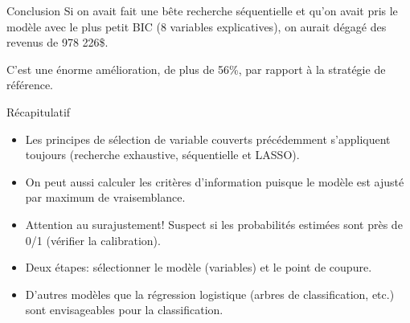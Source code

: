 \documentclass[
  ignorenonframetext,
]{beamer}
\providecommand{\tightlist}{%
  \setlength{\itemsep}{0pt}\setlength{\parskip}{0pt}}\usepackage{longtable,booktabs,array}
\begin{document}
\begin{frame}{Conclusion}
\protect\hypertarget{conclusion}{}
Si on avait fait une bête recherche séquentielle et qu'on avait pris le
modèle avec le plus petit BIC (8 variables explicatives), on aurait
dégagé des revenus de 978 226\$.

C'est une énorme amélioration, de plus de 56\%, par rapport à la
stratégie de référence.
\end{frame}

\begin{frame}{Récapitulatif}
\protect\hypertarget{ruxe9capitulatif-2}{}
\begin{itemize}
\tightlist
\item
  Les principes de sélection de variable couverts précédemment
  s'appliquent toujours (recherche exhaustive, séquentielle et LASSO).
\item
  On peut aussi calculer les critères d'information puisque le modèle
  est ajusté par maximum de vraisemblance.
\item
  Attention au surajustement! Suspect si les probabilités estimées sont
  près de 0/1 (vérifier la calibration).
\item
  Deux étapes: sélectionner le modèle (variables) et le point de
  coupure.
\item
  D'autres modèles que la régression logistique (arbres de
  classification, etc.) sont envisageables pour la classification.
\end{itemize}
\end{frame}
\end{document}
